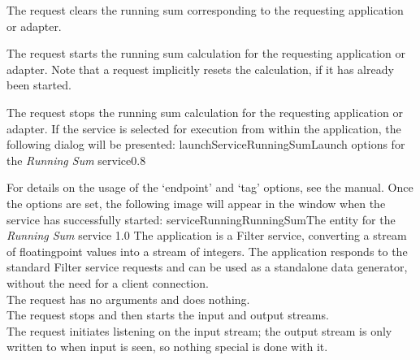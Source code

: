 The  request clears the running sum
corresponding to the requesting application or adapter.\\
%

The  request starts the running sum
calculation for the requesting application or adapter.
Note that a  request implicitly resets the
calculation, if it has already been started.\\
%

The  request stops the running sum
calculation for the requesting application or adapter.
%
\condPage{}
If the service is selected for execution from within the \emph{\MMMU} application, the
following dialog will be presented:
%
{launchServiceRunningSum}{Launch options for the \emph{Running Sum} service}{0.8}

For details on the usage of the `endpoint' and `tag' options, see the \emph{\MMMU} manual.
Once the options are set, the following image will appear in the \emph{\MMMU} window when
the service has successfully started:
%
{serviceRunningRunningSum}{The \emph{\MMMU} entity for the \emph{Running Sum} service}%
{1.0}
The  application is a Filter
service, converting a stream of floating\longDash{}point values into a stream of integers.
The application responds to the standard Filter service requests and can be used as a
standalone data generator, without the need for a client connection.\\

The  request has no arguments and
does nothing.\\

The  request stops and then
starts the input and output streams.\\

The  request initiates listening
on the input stream; the output stream is only written to when input is seen, so nothing
special is done with it.\\

